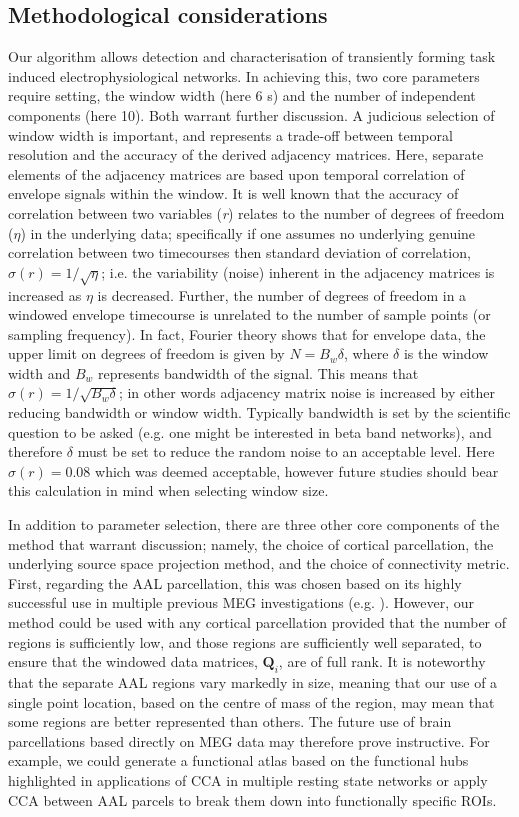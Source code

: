\subsection{Methodological considerations}
Our algorithm allows detection and characterisation of transiently forming task induced electrophysiological networks. In achieving this, two core parameters require setting, the window width (here 6 s) and the number of independent components (here 10). Both warrant further discussion. A judicious selection of window width is important, and represents a trade-off between temporal resolution and the accuracy of the derived adjacency matrices. Here, separate elements of the adjacency matrices are based upon temporal correlation of envelope signals within the window. It is well known that the accuracy of correlation between two variables (\textit{r}) relates to the number of degrees of freedom ($η$) in the underlying data; specifically if one assumes no underlying genuine correlation between two timecourses then standard deviation of correlation, $σ(r)=1/\sqrt{η}$; i.e. the variability (noise) inherent in the adjacency matrices is increased as $η$ is decreased. Further, the number of degrees of freedom in a windowed envelope timecourse is unrelated to the number of sample points (or sampling frequency). In fact, Fourier theory shows that for envelope data, the upper limit on degrees of freedom is given by $N=B_w δ$, where $δ$ is the window width and $B_w$ represents bandwidth of the signal. This means that $σ(r)=1/\sqrt{B_w δ}$; in other words adjacency matrix noise is increased by either reducing bandwidth or window width. Typically bandwidth is set by the scientific question to be asked (e.g. one might be interested in beta band networks), and therefore $δ$ must be set to reduce the random noise to an acceptable level. Here $σ(r)=0.08$ which was deemed acceptable, however future studies should bear this calculation in mind when selecting window size. 

In addition to parameter selection, there are three other core components of the method that warrant discussion; namely, the choice of cortical parcellation, the underlying source space projection method, and the choice of connectivity metric. First, regarding the AAL parcellation, this was chosen based on its highly successful use in multiple previous MEG investigations (e.g. \citealp{Tewarie2016}). However, our method could be used with any cortical parcellation provided that the number of regions is sufficiently low, and those regions are sufficiently well separated, to ensure that the windowed data matrices, $\mathbf{Q}_i$, are of full rank. It is noteworthy that the separate AAL regions vary markedly in size, meaning that our use of a single point location, based on the centre of mass of the region, may mean that some regions are better represented than others. The future use of brain parcellations based directly on MEG data may therefore prove instructive. For example, we could generate a functional atlas based on the functional hubs highlighted in applications of CCA in multiple resting state networks or apply CCA between AAL parcels to break them down into functionally specific ROIs.   

